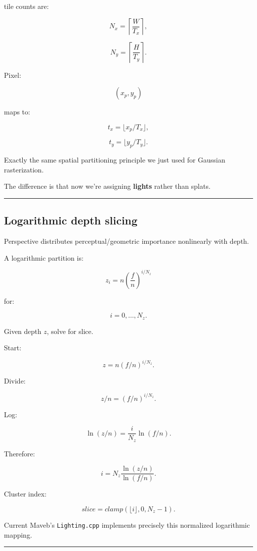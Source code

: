 tile counts are:

\[
N_x=
\left\lceil\frac{W}{T_x}\right\rceil,
\]

\[
N_y=
\left\lceil\frac{H}{T_y}\right\rceil.
\]

Pixel:

\[
(x_p,y_p)
\]

maps to:

\[
t_x=
\lfloor x_p/T_x\rfloor,
\]

\[
t_y=
\lfloor y_p/T_y\rfloor.
\]

Exactly the same spatial partitioning principle we just used for Gaussian rasterization.

The difference is that now we're assigning \textbf{lights} rather than splats.

\begin{center}\rule{0.5\linewidth}{0.5pt}\end{center}

\subsection{Logarithmic depth slicing}\label{04-visual-computing-ii-ch040-logarithmic-depth-slicing}

Perspective distributes perceptual/geometric importance nonlinearly with depth.

A logarithmic partition is:

\[
\boxed{
z_i
=
n
\left(
\frac fn
\right)^{i/N_z}
}
\]

for:

\[
i=0,\dots,N_z.
\]

Given depth \(z\), solve for slice.

Start:

\[
z=
n(f/n)^{i/N_z}.
\]

Divide:

\[
z/n=
(f/n)^{i/N_z}.
\]

Log:

\[
\ln(z/n)
=
\frac i{N_z}
\ln(f/n).
\]

Therefore:

\[
\boxed{
i
=
N_z
\frac{
\ln(z/n)
}{
\ln(f/n)
}.
}
\]

Cluster index:

\[
slice=
clamp(
\lfloor i\rfloor,
0,
N_z-1
).
\]

Current Maveb's \texttt{Lighting.cpp} implements precisely this normalized logarithmic mapping.

\begin{center}\rule{0.5\linewidth}{0.5pt}\end{center}

